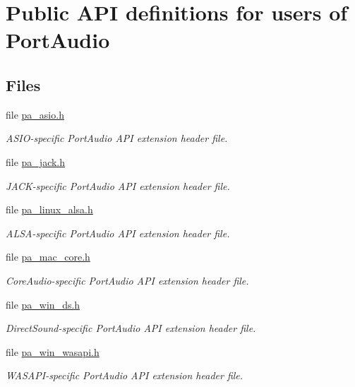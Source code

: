 \hypertarget{group__public__header}{}\section{Public A\+PI definitions for users of Port\+Audio}
\label{group__public__header}
\subsection*{Files}
\begin{DoxyCompactItemize}
\item 
file \hyperlink{pa__asio_8h}{pa\+\_\+asio.\+h}
\begin{DoxyCompactList}\small\item\em A\+S\+I\+O-\/specific Port\+Audio A\+PI extension header file. \end{DoxyCompactList}\item 
file \hyperlink{pa__jack_8h}{pa\+\_\+jack.\+h}
\begin{DoxyCompactList}\small\item\em J\+A\+C\+K-\/specific Port\+Audio A\+PI extension header file. \end{DoxyCompactList}\item 
file \hyperlink{pa__linux__alsa_8h}{pa\+\_\+linux\+\_\+alsa.\+h}
\begin{DoxyCompactList}\small\item\em A\+L\+S\+A-\/specific Port\+Audio A\+PI extension header file. \end{DoxyCompactList}\item 
file \hyperlink{pa__mac__core_8h}{pa\+\_\+mac\+\_\+core.\+h}
\begin{DoxyCompactList}\small\item\em Core\+Audio-\/specific Port\+Audio A\+PI extension header file. \end{DoxyCompactList}\item 
file \hyperlink{pa__win__ds_8h}{pa\+\_\+win\+\_\+ds.\+h}
\begin{DoxyCompactList}\small\item\em Direct\+Sound-\/specific Port\+Audio A\+PI extension header file. \end{DoxyCompactList}\item 
file \hyperlink{pa__win__wasapi_8h}{pa\+\_\+win\+\_\+wasapi.\+h}
\begin{DoxyCompactList}\small\item\em W\+A\+S\+A\+P\+I-\/specific Port\+Audio A\+PI extension header file. \end{DoxyCompactList}\item 

\end{DoxyCompactItemize}
